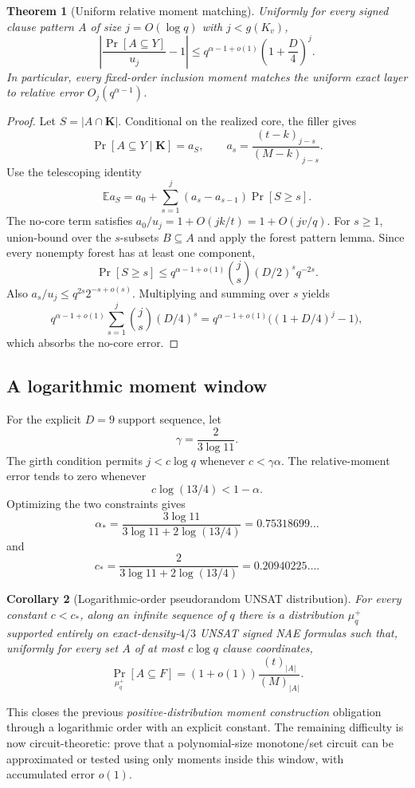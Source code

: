 \documentclass[11pt]{article}
\newtheorem{theorem}{Theorem}
\newtheorem{corollary}[theorem]{Corollary}
\begin{document}
\begin{theorem}[Uniform relative moment matching]
Uniformly for every signed clause pattern $A$ of size $j=O(\log q)$ with $j<g(K_v)$,
\[\boxed{\left|\frac{\Pr[A\subseteq Y]}{u_j}-1\right|\le q^{\alpha-1+o(1)}\left(1+\frac D4\right)^j.}\]
In particular, every fixed-order inclusion moment matches the uniform exact layer to relative error $O_j(q^{\alpha-1})$.
\end{theorem}
\begin{proof}
Let $S=|A\cap\mathbf K|$. Conditional on the realized core, the filler gives
\[\Pr[A\subseteq Y\mid\mathbf K]=a_S,\qquad a_s=\frac{(t-k)_{j-s}}{(M-k)_{j-s}}.\]
Use the telescoping identity
\[\mathbb E a_S=a_0+\sum_{s=1}^j(a_s-a_{s-1})\Pr[S\ge s].\]
The no-core term satisfies $a_0/u_j=1+O(jk/t)=1+O(jv/q)$. For $s\ge1$, union-bound over the $s$-subsets $B\subseteq A$ and apply the forest pattern lemma. Since every nonempty forest has at least one component,
\[\Pr[S\ge s]\le q^{\alpha-1+o(1)}\binom js(D/2)^s q^{-2s}.\]
Also $a_s/u_j\le q^{2s}2^{-s+o(s)}$. Multiplying and summing over $s$ yields
\[q^{\alpha-1+o(1)}\sum_{s=1}^j\binom js(D/4)^s=q^{\alpha-1+o(1)}\big((1+D/4)^j-1\big),\]
which absorbs the no-core error.
\end{proof}

\subsection{A logarithmic moment window}
For the explicit $D=9$ support sequence, let
\[\gamma=\frac{2}{3\log11}.\]
The girth condition permits $j<c\log q$ whenever $c<\gamma\alpha$. The relative-moment error tends to zero whenever
\[c\log(13/4)<1-\alpha.\]
Optimizing the two constraints gives
\[\alpha_* = \frac{3\log11}{3\log11+2\log(13/4)}=0.75318699\ldots\]
and
\[\boxed{c_* = \frac{2}{3\log11+2\log(13/4)}=0.20940225\ldots.}\]

\begin{corollary}[Logarithmic-order pseudorandom UNSAT distribution]
For every constant $c<c_*$, along an infinite sequence of $q$ there is a distribution $\mu_q^+$ supported entirely on exact-density-$4/3$ UNSAT signed NAE formulas such that, uniformly for every set $A$ of at most $c\log q$ clause coordinates,
\[\boxed{\Pr_{\mu_q^+}[A\subseteq F]=(1+o(1))\frac{(t)_{|A|}}{(M)_{|A|}}.}\]
\end{corollary}

This closes the previous \emph{positive-distribution moment construction} obligation through a logarithmic order with an explicit constant. The remaining difficulty is now circuit-theoretic: prove that a polynomial-size monotone/set circuit can be approximated or tested using only moments inside this window, with accumulated error $o(1)$.
\end{document}
